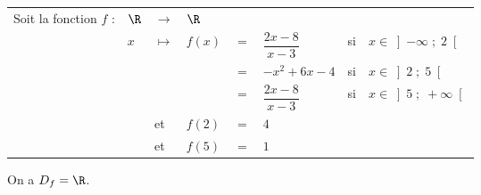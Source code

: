 \begin{tabular}{llllllll}
\hspace{-.3cm} Soit la fonction $f$ : & $\R$ & $\longrightarrow$ & $\R$ & & & & \\
& $x$ & $\longmapsto$ & $f\left(x\right)$ & $ = $ & $ \dfrac{2x - 8}{x-3}$ & si & $x \in \left]-\infty \; ; \; 2\right[$ \vspace*{.3cm} \\
& & & & $=$ & $-x^2 + 6x - 4$ &  si & $x \in \left]2 \; ; \; 5\right[$ \vspace*{.3cm} \\
& & & & $=$ & $\dfrac{2x - 8}{x-3}$ &  si & $x \in \left]5 \; ; \; +\infty\right[$ \vspace*{.3cm} \\
& & et & $f(2)$ & $ = $ & $4$ & & \\
& & et & $f(5)$ & $ = $ & $1$ & & \\
\end{tabular}

On a $D_f = \R$. \\

